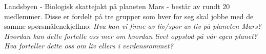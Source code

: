 Landsbyen - Biologisk skattejakt på planeten Mars - består av rundt 20 medlemmer.
Disse er fordelt på tre grupper som hver for seg skal jobbe med de samme spørsmålene{kjellmo}:
{\textit{Hva kan vi finne av liv/spor av liv på planeten Mars?
Hvordan kan dette fortelle oss mer om hvordan livet oppstod på vår egen planet?
Hva forteller dette oss om liv ellers i verdensrommet?}}













